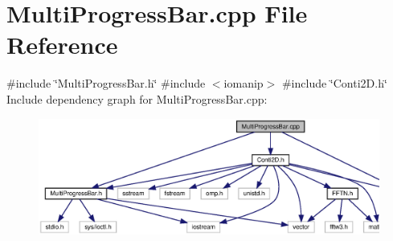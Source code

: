 \section{Multi\+Progress\+Bar.\+cpp File Reference}
\label{MultiProgressBar_8cpp}
{\ttfamily \#include \char`\"{}Multi\+Progress\+Bar.\+h\char`\"{}}\newline
{\ttfamily \#include $<$iomanip$>$}\newline
{\ttfamily \#include \char`\"{}Conti2\+D.\+h\char`\"{}}\newline
Include dependency graph for Multi\+Progress\+Bar.\+cpp\+:\nopagebreak
\begin{figure}[H]
\begin{center}
\leavevmode
\includegraphics[width=350pt]{MultiProgressBar_8cpp__incl}
\end{center}
\end{figure}
